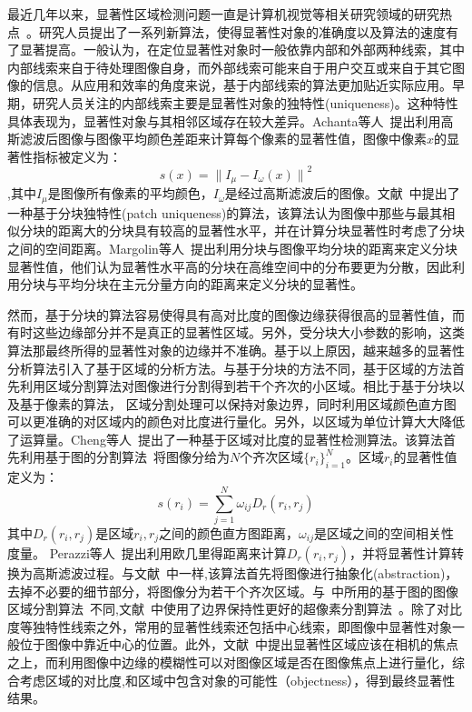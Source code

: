 最近几年以来，显著性区域检测问题一直是计算机视觉等相关研究领域的研究热点~\cite{saliencySurvey}。研究人员提出了一系列新算法，使得显著性对象的准确度以及算法的速度有了显著提高。一般认为，在定位显著性对象时一般依靠内部和外部两种线索\cite{saliencySurvey}，其中内部线索来自于待处理图像自身，而外部线索可能来自于用户交互或来自于其它图像的信息。从应用和效率的角度来说，基于内部线索的算法更加贴近实际应用。早期，研究人员关注的内部线索主要是显著性对象的独特性(uniqueness)。这种特性具体表现为，显著性对象与其相邻区域存在较大差异。Achanta等人~\cite{frequenyTuned}提出利用高斯滤波后图像与图像平均颜色差距来计算每个像素的显著性值，图像中像素$x$的显著性指标被定义为：
$$s(x)={\parallel I_{\mu }-I_{\omega}(x)\parallel}^{2}$$
,其中$I_{\mu }$是图像所有像素的平均颜色，$I_{\omega}$是经过高斯滤波后的图像。文献~中提出了一种基于分块独特性(patch uniqueness)的算法，该算法认为图像中那些与最其相似分块的距离大的分块具有较高的显著性水平，并在计算分块显著性时考虑了分块之间的空间距离。Margolin等人~\cite{whatmakes}提出利用分块与图像平均分块的距离来定义分块显著性值，他们认为显著性水平高的分块在高维空间中的分布要更为分散，因此利用分块与平均分块在主元分量方向的距离来定义分块的显著性。\par
然而，基于分块的算法容易使得具有高对比度的图像边缘获得很高的显著性值，而有时这些边缘部分并不是真正的显著性区域。另外，受分块大小参数的影响，这类算法那最终所得的显著性对象的边缘并不准确。基于以上原因，越来越多的显著性分析算法引入了基于区域的分析方法。与基于分块的方法不同，基于区域的方法首先利用区域分割算法对图像进行分割得到若干个齐次的小区域。相比于基于分块以及基于像素的算法， 区域分割处理可以保持对象边界，同时利用区域颜色直方图可以更准确的对区域内的颜色对比度进行量化。另外，以区域为单位计算大大降低了运算量。Cheng等人~\cite{ChengPAMI}提出了一种基于区域对比度的显著性检测算法。该算法首先利用基于图的分割算法~\cite{graphseg}将图像分给为$N$个齐次区域$\{r_{i}\}_{i=1}^{N}$。区域$r_{i}$的显著性值定义为：
$$s(r_{i})=\sum_{j=1}^{N}\omega_{ij}D_{r}(r_{i},r_{j})$$
其中$D_{r}(r_{i},r_{j})$是区域$r_{i},r_{j}$之间的颜色直方图距离，$\omega_{ij}$是区域之间的空间相关性度量。
Perazzi等人~\cite{saliencyFilter}提出利用欧几里得距离来计算$D_{r}(r_{i},r_{j})$，并将显著性计算转换为高斯滤波过程。与文献~中一样,该算法首先将图像进行抽象化(abstraction)，去掉不必要的细节部分，将图像分为若干个齐次区域。与~中所用的基于图的图像区域分割算法~\cite{graphseg}不同,文献~中使用了边界保持性更好的超像素分割算法~\cite{SLIC}。除了对比度等独特性线索之外，常用的显著性线索还包括中心线索，即图像中显著性对象一般位于图像中靠近中心的位置。此外，文献~中提出显著性区域应该在相机的焦点之上，而利用图像中边缘的模糊性可以对图像区域是否在图像焦点上进行量化，综合考虑区域的对比度,和区域中包含对象的可能性（objectness），得到最终显著性结果。\par
